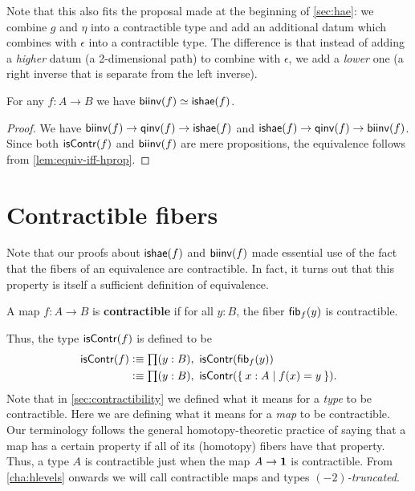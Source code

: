Note that this also fits the proposal made at the beginning of \autoref{sec:hae}: we combine $g$ and $\eta$ into a contractible type and add an additional datum which combines with $\epsilon$ into a contractible type.
The difference is that instead of adding a \emph{higher} datum (a 2-dimensional path) to combine with $\epsilon$, we add a \emph{lower} one (a right inverse that is separate from the left inverse).

\begin{cor}\label{thm:equiv-biinv-isequiv}
  For any $f:A\to B$ we have $\mathsf{biinv}(f) \simeq \mathsf{ishae}(f)$.
\end{cor}
\begin{proof}
  We have $\mathsf{biinv}(f) \to \mathsf{qinv}(f) \to \mathsf{ishae}(f)$ and $\mathsf{ishae}(f) \to \mathsf{qinv}(f) \to \mathsf{biinv}(f)$.
  Since both $\mathsf{isContr}(f)$ and $\mathsf{biinv}(f)$ are mere propositions, the equivalence follows from \autoref{lem:equiv-iff-hprop}.
\end{proof}


\section{Contractible fibers}
\label{sec:contrf}

Note that our proofs about $\mathsf{ishae}(f)$ and $\mathsf{biinv}(f)$ made essential use of the fact that the fibers of an equivalence are contractible.
In fact, it turns out that this property is itself a sufficient definition of equivalence.

\begin{defn} \label{defn:equivalence}
  A map $f:A\to B$ is \textbf{contractible} if for all $y:B$, the fiber $\mathsf{fib}_{f}(y)$ is contractible.
\end{defn}

Thus, the type $\mathsf{isContr}(f)$ is defined to be
\begin{align}
  \iscontr(f) &\defeq \prd{y:B} \iscontr(\hfib f y)\\
  &\defeq \prd{y:B} \iscontr (\setof{x:A | f(x) = y}).\label{eq:iscontrf}
\end{align}
Note that in \autoref{sec:contractibility} we defined what it means for a \emph{type} to be contractible.
Here we are defining what it means for a \emph{map} to be contractible.
Our terminology follows the general homotopy-theoretic practice of saying that a map has a certain property if all of its (homotopy) fibers have that property.
Thus, a type $A$ is contractible just when the map $A\to\mathbf{1}$ is contractible.
From \autoref{cha:hlevels} onwards we will call contractible maps and types \emph{$(-2)$-truncated}.

